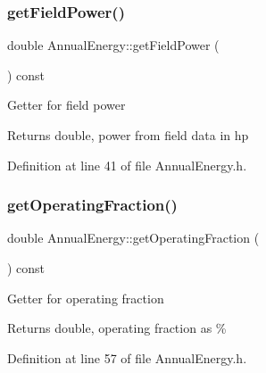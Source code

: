 \mbox{\label{class_annual_energy_a52aa52274243f578ea7f92d27707cacb}} 
\subsubsection{\texorpdfstring{get\+Field\+Power()}{getFieldPower()}\hspace{0.1cm}{\footnotesize\ttfamily [3/3]}}
{\footnotesize\ttfamily double Annual\+Energy\+::get\+Field\+Power (\begin{DoxyParamCaption}{ }\end{DoxyParamCaption}) const\hspace{0.3cm}{\ttfamily [inline]}}

Getter for field power \begin{DoxyReturn}{Returns}
double, power from field data in hp 
\end{DoxyReturn}


Definition at line 41 of file Annual\+Energy.\+h.

\mbox{\label{class_annual_energy_a51c2bd68a5268ec9bafe3c70b3a7a6ad}} 
\subsubsection{\texorpdfstring{get\+Operating\+Fraction()}{getOperatingFraction()}\hspace{0.1cm}{\footnotesize\ttfamily [1/3]}}
{\footnotesize\ttfamily double Annual\+Energy\+::get\+Operating\+Fraction (\begin{DoxyParamCaption}{ }\end{DoxyParamCaption}) const\hspace{0.3cm}{\ttfamily [inline]}}

Getter for operating fraction \begin{DoxyReturn}{Returns}
double, operating fraction as \% 
\end{DoxyReturn}


Definition at line 57 of file Annual\+Energy.\+h.

\mbox{\label{class_annual_energy_a51c2bd68a5268ec9bafe3c70b3a7a6ad}} 
